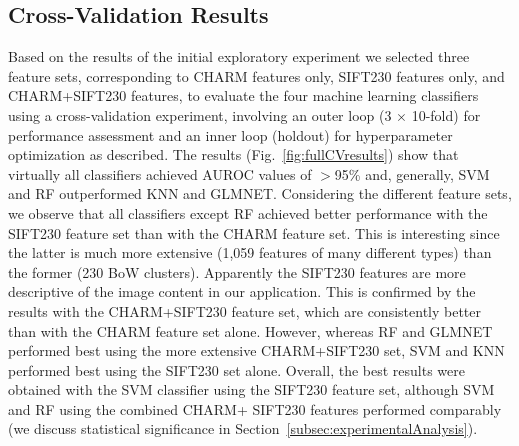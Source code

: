 \subsection{Cross-Validation Results}
\label{subsec:baselineResults}

Based on the results of the initial exploratory experiment we selected three feature sets, corresponding to CHARM features only, SIFT230 features only, and CHARM+SIFT230 features, to evaluate the four machine learning classifiers using a cross-validation experiment, involving an outer loop (3 $\times$ 10-fold) for performance assessment and an inner loop (holdout) for hyperparameter optimization as described. The results (Fig.~\ref{fig:fullCVresults}) show that virtually all classifiers achieved AUROC values of $>$95\% and, generally, SVM and RF outperformed KNN and GLMNET. Considering the different feature sets, we observe that all classifiers except RF achieved better performance with the SIFT230 feature set than with the CHARM feature set. This is interesting since the latter is much more extensive (1,059 features of many different types) than the former (230 BoW clusters). Apparently the SIFT230 features are more descriptive of the image content in our application. This is confirmed by the results with the CHARM+SIFT230 feature set, which are consistently better than with the CHARM feature set alone. However, whereas RF and GLMNET performed best using the more extensive CHARM+SIFT230 set, SVM and KNN performed best using the SIFT230 set alone. Overall, the best results were obtained with the SVM classifier using the SIFT230 feature set, although SVM and RF using the combined CHARM+ SIFT230 features performed comparably (we discuss statistical significance in Section~\ref{subsec:experimentalAnalysis}).

